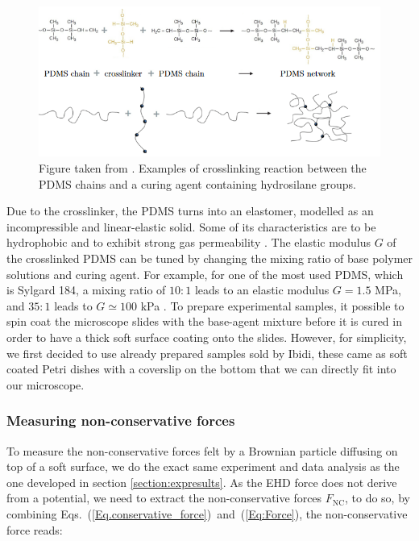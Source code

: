 \begin{figure}[H]
	\centering
	\includegraphics[scale = 0.8]{02_body/chapter4/images/EHD_forces/figure_cross.png}
	\caption{Figure taken from \cite{tucher_analysis_2016}. Examples of crosslinking reaction between the \gls{PDMS} chains and a curing agent containing hydrosilane groups.}
	\label{fig.crosslink}
\end{figure}


Due to the crosslinker, the \gls{PDMS} turns into an elastomer, modelled as an incompressible and linear-elastic solid. Some of its characteristics are to be hydrophobic and to exhibit strong gas permeability \cite{xia_soft_1998}. The elastic modulus $G$ of the crosslinked \gls{PDMS} can be tuned by changing the mixing ratio of base polymer solutions and curing agent. For example, for one of the most used \gls{PDMS}, which is Sylgard 184, a mixing ratio of $10:1$ leads to an elastic modulus $G=1.5$ MPa, and $35:1$ leads to $G\simeq 100$ kPa \cite{wang_crosslinking_2014}. To prepare experimental samples, it possible to spin coat the microscope slides with the base-agent mixture before it is cured in order to have a thick soft surface coating onto the slides. However, for simplicity, we first decided to use already prepared samples sold by Ibidi, these came as soft coated Petri dishes with a coverslip on the bottom that we can directly fit into our microscope.


\subsubsection{Measuring non-conservative forces}

To measure the non-conservative forces felt by a Brownian particle diffusing on top of a soft surface, we do the exact same experiment and data analysis as the one developed in section \ref{section:expresults}. As the \gls{EHD} force does not derive from a potential, we need to extract the non-conservative forces $F_\mathrm{NC}$, to do so, by combining Eqs.~(\ref{Eq.conservative_force})~and~(\ref{Eq:Force}), the non-conservative force reads:

